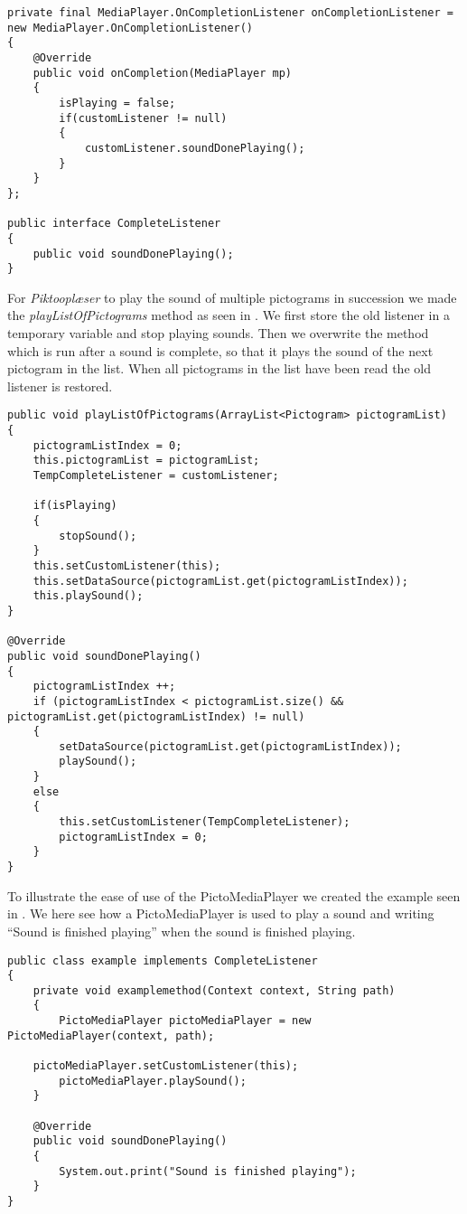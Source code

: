 \begin{lstlisting}[caption={onCompletionListener method of PictoMediaPlayer.}, label={lst:completelistener}]
private final MediaPlayer.OnCompletionListener onCompletionListener = new MediaPlayer.OnCompletionListener()
{
    @Override
    public void onCompletion(MediaPlayer mp) 
    {
        isPlaying = false;
        if(customListener != null)
        {
            customListener.soundDonePlaying();
        }
    }
};

public interface CompleteListener
{
    public void soundDonePlaying();
}
\end{lstlisting}

For \textit{Piktooplæser} to play the sound of multiple pictograms in succession we made the \textit{playListOfPictograms} method as seen in . 
We first store the old listener in a temporary variable and stop playing sounds. Then we overwrite the method which is run after a sound is complete, so that it plays the sound of the next pictogram in the list. When all pictograms in the list have been read the old listener is restored.

\begin{lstlisting}[caption={playListOfPictograms method of PictoMediaPlayer.}, label={lst:playlist}]
public void playListOfPictograms(ArrayList<Pictogram> pictogramList)
{
    pictogramListIndex = 0;
    this.pictogramList = pictogramList;
    TempCompleteListener = customListener;

    if(isPlaying)
    {
        stopSound();
    }
    this.setCustomListener(this);
    this.setDataSource(pictogramList.get(pictogramListIndex));
    this.playSound();
}

@Override
public void soundDonePlaying()
{
    pictogramListIndex ++;
    if (pictogramListIndex < pictogramList.size() && pictogramList.get(pictogramListIndex) != null)
    {
        setDataSource(pictogramList.get(pictogramListIndex));
        playSound();
    }
    else
    {
        this.setCustomListener(TempCompleteListener);
        pictogramListIndex = 0;
    }
}
\end{lstlisting}

To illustrate the ease of use of the PictoMediaPlayer we created the example seen in . 
We here see how a PictoMediaPlayer is used to play a sound and writing ``Sound is finished playing'' when the sound is finished playing.

\begin{lstlisting}[caption={Example of PictoMediaPlayer.},label={lst:mediaplayerexample}]
public class example implements CompleteListener
{
    private void examplemethod(Context context, String path)
    {
        PictoMediaPlayer pictoMediaPlayer = new PictoMediaPlayer(context, path);

	pictoMediaPlayer.setCustomListener(this);
        pictoMediaPlayer.playSound();
    }

    @Override
    public void soundDonePlaying()
    {
        System.out.print("Sound is finished playing");
    }
}
\end{lstlisting}

